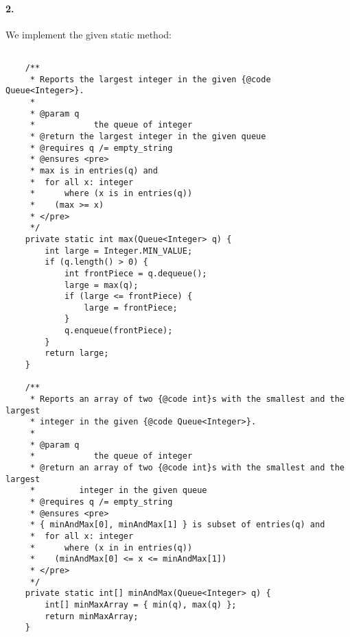 \documentclass[10pt]{article}
\begin{document}
\paragraph{2. } We implement the given static method: 
\begin{lstlisting} 

    /**
     * Reports the largest integer in the given {@code Queue<Integer>}.
     *
     * @param q
     *            the queue of integer
     * @return the largest integer in the given queue
     * @requires q /= empty_string
     * @ensures <pre>
     * max is in entries(q) and
     *  for all x: integer
     *      where (x is in entries(q))
     *    (max >= x)
     * </pre>
     */
    private static int max(Queue<Integer> q) {
        int large = Integer.MIN_VALUE;
        if (q.length() > 0) {
            int frontPiece = q.dequeue();
            large = max(q);
            if (large <= frontPiece) {
                large = frontPiece;
            }
            q.enqueue(frontPiece);
        }
        return large;
    }

    /**
     * Reports an array of two {@code int}s with the smallest and the largest
     * integer in the given {@code Queue<Integer>}.
     *
     * @param q
     *            the queue of integer
     * @return an array of two {@code int}s with the smallest and the largest
     *         integer in the given queue
     * @requires q /= empty_string
     * @ensures <pre>
     * { minAndMax[0], minAndMax[1] } is subset of entries(q) and
     *  for all x: integer
     *      where (x in in entries(q))
     *    (minAndMax[0] <= x <= minAndMax[1])
     * </pre>
     */
    private static int[] minAndMax(Queue<Integer> q) {
        int[] minMaxArray = { min(q), max(q) };
        return minMaxArray;
    }
    

\end{lstlisting}
\end{document}

